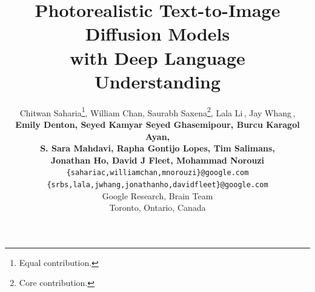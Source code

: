 \documentclass{article}
\title{Photorealistic Text-to-Image Diffusion Models \\ with Deep Language Understanding}
\author{%
  Chitwan Saharia\thanks{Equal contribution.}\:,\; William Chan\footnotemark[1]\:,\; Saurabh Saxena\thanks{Core contribution.}\;,\; Lala Li\footnotemark[2]\,,\; Jay Whang\footnotemark[2]\,, \\
  \textbf{Emily Denton,\; Seyed Kamyar Seyed Ghasemipour,\; Burcu Karagol Ayan,} \\
  \textbf{S. Sara Mahdavi,\; Rapha Gontijo Lopes,\; Tim Salimans,} \\
  \textbf{Jonathan Ho\footnotemark[2]\;, David J Fleet\footnotemark[2]\;, Mohammad Norouzi\footnotemark[1]\;} \\[.2cm]
  \texttt{\{sahariac,williamchan,mnorouzi\}@google.com} \\
  \texttt{\{srbs,lala,jwhang,jonathanho,davidfleet\}@google.com}\\[.2cm]
  Google Research, Brain Team \\
  Toronto, Ontario, Canada
}
\begin{document}
\maketitle

















\FloatBarrier
\newpage
\appendix
\renewcommand\thefigure{A.\arabic{figure}} \setcounter{figure}{0}
\renewcommand\thetable{A.\arabic{table}} \setcounter{table}{0}

\end{document}
